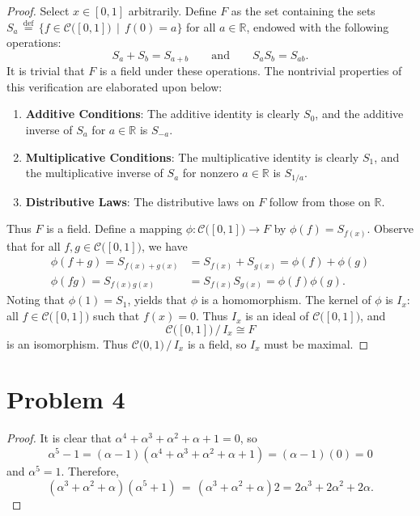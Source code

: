 \documentclass[11pt]{article}
\begin{document}
\begin{proof}
  Select $x \in [0, 1]$ arbitrarily. Define $F$ as the set containing the sets $S_{a} \, \stackrel{\text{def}}{=} \, \{ f \in \mathcal{C} \big( [0, 1] \big) \, \mid \, f(0) = a\}$ for all $a \in \mathbb{R}$, endowed with the following operations:
  \[
    S_{a} + S_{b} = S_{a + b} \qquad \text{and} \qquad S_{a}S_{b} = S_{ab}.
  \]
  It is trivial that $F$ is a field under these operations. The nontrivial properties of this verification are elaborated upon below:
  \begin{enumerate}
    \item \textbf{Additive Conditions}: The additive identity is clearly $S_{0}$, and the additive inverse of $S_{a}$ for $a \in \mathbb{R}$ is $S_{-a}$.
    \item \textbf{Multiplicative Conditions}: The multiplicative identity is clearly $S_{1}$, and the multiplicative inverse of $S_{a}$ for nonzero $a \in \mathbb{R}$ is $S_{1 / a}$.
    \item \textbf{Distributive Laws}: The distributive laws on $F$ follow from those on $\mathbb{R}$.
  \end{enumerate}
  Thus $F$ is a field. Define a mapping $\phi : \mathcal{C} \big( [0, 1] \big) \to F$ by $\phi(f) = S_{f(x)}$. Observe that for all $f, g \in \mathcal{C} \big( [0, 1] \big)$, we have
  \begin{align*}
    \phi(f + g) = S_{f(x) + g(x)} &= S_{f(x)} + S_{g(x)} = \phi(f) + \phi(g) \\
    \phi(fg) = S_{f(x)g(x)} &= S_{f(x)} S_{g(x)} = \phi(f) \phi(g).
  \end{align*}
  Noting that $\phi(1) = S_{1}$, yields that $\phi$ is a homomorphism. The kernel of $\phi$ is $I_{x}$: all $f \in \mathcal{C} \big( [0, 1] \big)$ such that $f(x) = 0$. Thus $I_{x}$ is an ideal of $\mathcal{C} \big( [0, 1] \big)$, and
  \[
    \mathcal{C} \big( [0, 1] \big) \, / \, I_{x} \cong F
  \]
  is an isomorphism. Thus $\mathcal{C} \big( 0, 1 \big) \, / \, I_{x}$ is a field, so $I_{x}$ must be maximal.
\end{proof}


\section{Problem 4}

\begin{proof}
  It is clear that $\alpha^{4} + \alpha^{3} + \alpha^{2} + \alpha + 1 = 0$, so 
  \[
    \alpha^{5} - 1 = (\alpha - 1)(\alpha^{4} + \alpha^{3} + \alpha^{2} + \alpha + 1) = (\alpha - 1)(0) = 0
  \]
  and $\alpha^{5} = 1$. Therefore,
  \[
    (\alpha^{3} + \alpha^{2} + \alpha)(\alpha^{5} + 1) \, = \, (\alpha^{3} + \alpha^{2} + \alpha)2 = \boxed{2\alpha^{3} + 2\alpha^{2} + 2\alpha}.
  \]
\end{proof}
\end{document}
